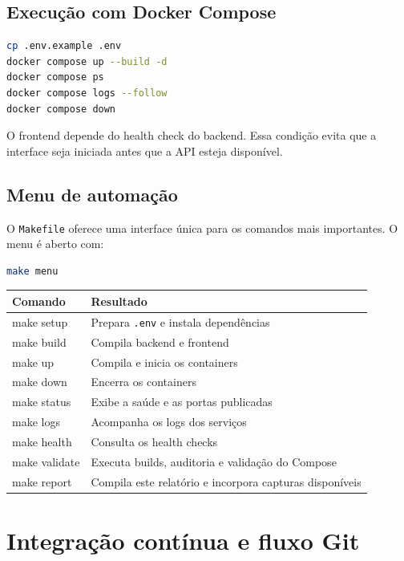 \documentclass[12pt,a4paper,openany]{report}
\begin{document}
\section{Execução com Docker Compose}

\begin{lstlisting}[language=bash]
cp .env.example .env
docker compose up --build -d
docker compose ps
docker compose logs --follow
docker compose down
\end{lstlisting}

O frontend depende do health check do backend. Essa condição evita que a interface seja iniciada antes que a API esteja disponível.

\section{Menu de automação}

O \texttt{Makefile} oferece uma interface única para os comandos mais importantes. O menu é aberto com:

\begin{lstlisting}[language=bash]
make menu
\end{lstlisting}

\begin{tabularx}{\textwidth}{>{\ttfamily}p{} X}
\toprule
\normalfont\textbf{Comando} & \normalfont\textbf{Resultado} \\
\midrule
make setup & Prepara \texttt{.env} e instala dependências \\
make build & Compila backend e frontend \\
make up & Compila e inicia os containers \\
make down & Encerra os containers \\
make status & Exibe a saúde e as portas publicadas \\
make logs & Acompanha os logs dos serviços \\
make health & Consulta os health checks \\
make validate & Executa builds, auditoria e validação do Compose \\
make report & Compila este relatório e incorpora capturas disponíveis \\
\bottomrule
\end{tabularx}

\chapter{Integração contínua e fluxo Git}
\end{document}
